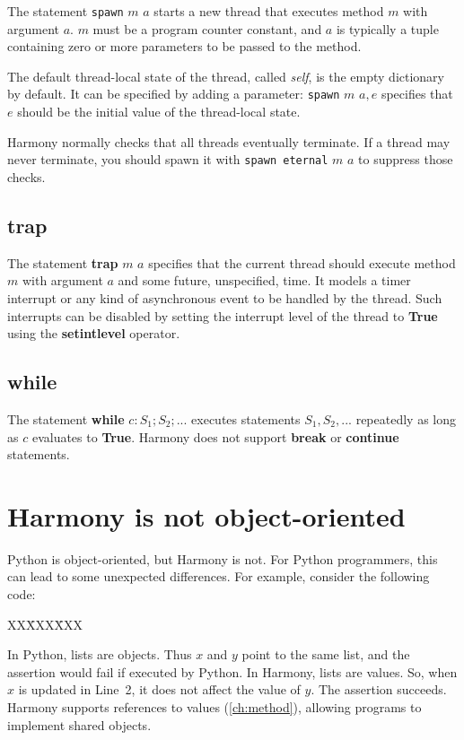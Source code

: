 \documentclass{report}
\newcommand{\harmonysource}[1]{
\begin{tabbing}
XX\=XXX\=XXX\kill
    
\end{tabbing}
}
\newenvironment{code}{
\tcolorbox
}{
\endtcolorbox
}
\begin{document}
The statement \texttt{spawn} $m$ $a$ starts a new thread that executes
method $m$ with argument $a$. $m$ must be a program counter constant,
and $a$ is typically a tuple containing
zero or more parameters to be passed to the method.

The default thread-local state of the thread, called \textit{self},
is the empty dictionary by default.  It can be specified by adding
a parameter: \texttt{spawn} $m$ $a, e$ specifies that $e$ should be
the initial value of the thread-local state.

Harmony normally checks that all threads eventually terminate.
If a thread may never terminate, you should spawn it with
\texttt{spawn eternal} $m$ $a$ to suppress those checks.

\subsection*{\textbf{trap}}

The statement \textbf{trap} $m$ $a$ specifies that the current thread
should execute method $m$ with argument $a$ and some future, unspecified,
time.  It models a timer interrupt or any kind of asynchronous event to
be handled by the thread.  Such interrupts can be disabled by setting
the interrupt level of the thread to \textbf{True} using the
\textbf{setintlevel} operator.

\subsection*{\textbf{while}}

The statement \textbf{while} $c: S_1; S_2; ...$ executes statements
$S_1, S_2, ...$ repeatedly as long as $c$ evaluates to \textbf{True}.
Harmony does not support \textbf{break} or \textbf{continue} statements.

\section{Harmony is not object-oriented}

Python is object-oriented, but Harmony is not.  For Python programmers,
this can lead to some unexpected differences.
For example, consider the following code:

\begin{code}
\harmonysource{oo}
\end{code}

In Python, lists are objects.  Thus $x$ and $y$ point to the same list,
and the assertion would fail if executed by Python.
In Harmony, lists are values.  So, when $x$ is updated in Line~2, it does
not affect the value of $y$.  The assertion succeeds.
Harmony supports references to values (\autoref{ch:method}),
allowing programs to implement shared objects.
\end{document}
